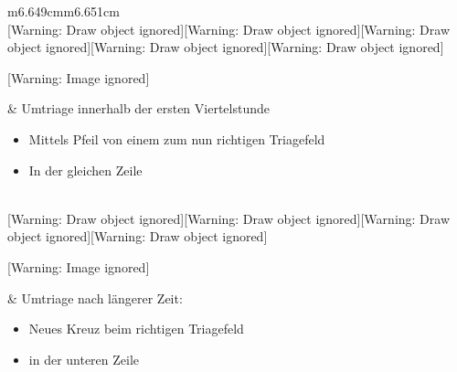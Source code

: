 \documentclass{article}
\begin{document}
\begin{center}
\tablehead{}\begin{supertabular}{m{6.649cm}m{6.651cm}}
\\
[Warning: Draw object ignored][Warning: Draw object ignored][Warning:
Draw object ignored][Warning: Draw object ignored][Warning: Draw object
ignored][Warning: Draw object ignored]

\begin{center}
 [Warning: Image ignored] %

\end{center}
 &
{\mdseries\color{black} Umtriage innerhalb der ersten Viertelstunde}

\begin{itemize}
\item {\mdseries Mittels Pfeil von einem zum nun richtigen Triagefeld}

\item {\mdseries In der gleichen Zeile}

\end{itemize}
\\
[Warning: Draw object ignored][Warning: Draw object ignored][Warning:
Draw object ignored][Warning: Draw object ignored][Warning: Draw object
ignored]

\begin{center}
 [Warning: Image ignored] %

\end{center}
 &
{\mdseries\color{black} Umtriage nach l\"angerer Zeit:}

\begin{itemize}
\item {\mdseries Neues Kreuz beim richtigen Triagefeld}

\item {\mdseries in der unteren Zeile}

\end{itemize}
\\
\end{supertabular}
\end{center}
\end{document}
